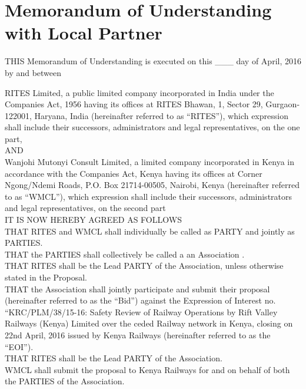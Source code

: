 \section{Memorandum of Understanding with Local Partner}


THIS Memorandum of Understanding is executed on this ___ day of April, 2016 by and between 

RITES Limited, a public limited company incorporated in India under the Companies Act, 1956 having its offices at RITES Bhawan, 1, Sector 29, Gurgaon-122001, Haryana, India (hereinafter referred to as “RITES”), which expression shall include their successors, administrators and legal representatives, on the one part,\\

AND\\

Wanjohi Mutonyi Consult Limited, a limited company incorporated in Kenya in accordance with the Companies Act, Kenya having its offices at Corner Ngong/Ndemi Roads, P.O. Box 21714-00505, Nairobi, Kenya (hereinafter referred to as “WMCL”), which expression shall include their successors, administrators and legal representatives, on the second part\\

IT IS NOW HEREBY AGREED AS FOLLOWS\\

THAT RITES and WMCL shall individually be called as PARTY and jointly as PARTIES.\\

THAT the PARTIES shall collectively be called a an Association .\\

THAT RITES shall be the Lead PARTY of the Association, unless otherwise stated in the Proposal.\\

THAT the Association shall jointly participate and submit their proposal (hereinafter referred to as the “Bid”) against the Expression of Interest no. “KRC/PLM/38/15-16: Safety Review of Railway Operations by Rift Valley Railways (Kenya) Limited over the ceded Railway network in Kenya, closing on 22nd April, 2016 issued by Kenya Railways (hereinafter referred to as the “EOI”).\\

THAT RITES shall be the Lead PARTY of the Association.\\
WMCL  shall submit the proposal to Kenya Railways for and on behalf of both the PARTIES of the Association.\\

